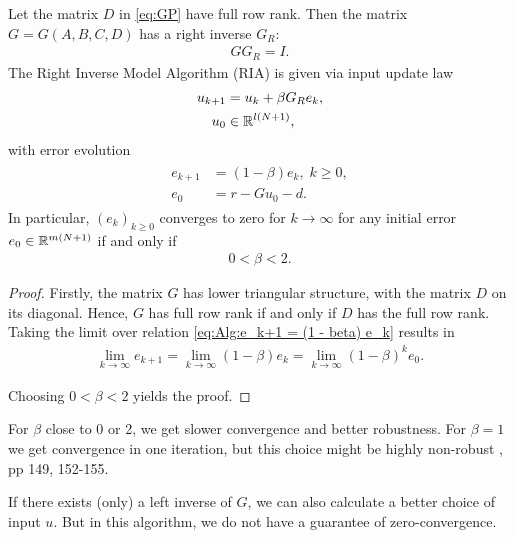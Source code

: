 \begin{alg}
	\label{alg: rightInv}
	Let the matrix $D$ in \eqref{eq:GP} have full row rank. Then the matrix $G = G(A, B, C, D)$ has a right inverse $G_R$: 
	\begin{align*}
	G G_R = I. 
	\end{align*}
	The Right Inverse Model Algorithm (RIA) is given via input update law 
	\begin{align}
	\label{eq:errRightInv}
	\begin{split}
	u_{k+1} &= u_k + \beta G_R e_k, \\
	u_0& \in {\mathbb{R}}^{l (N+1)},
	\end{split}	
	\end{align}
	with error evolution
	\begin{align}
	\label{eq:Alg:e_k+1 = (1 - beta) e_k}
	\begin{split}
	e_{k+1} &= (1- \beta) e_{k}, \; k\geq 0, \\
	e_0 &= r -  Gu_0 -d.
	\end{split}
	\end{align}
	In particular, $(e_k)_{k\geq 0}$ converges to zero for $k \to \infty$ for any initial error $e_0 \in {\mathbb{R}}^{m(N+1)}$ if and only if 
	\begin{align*}
	0 < \beta < 2.
	\end{align*}
\end{alg}
\begin{proof}
	Firstly, the matrix $G$ has lower triangular structure, with the matrix $D$ on its diagonal. Hence, $G$ has full row rank if and only if $D$ has the full row rank.
	Taking the limit over relation \eqref{eq:Alg:e_k+1 = (1 - beta) e_k} results in
	\begin{align}
	\lim_{k \to \infty} e_{k+1} = \lim_{k \to \infty}(1- \beta) e_{k} = \lim_{k \to \infty}(1 - \beta)^k e_0.
	\end{align}
	
	Choosing $0<\beta < 2$ yields the proof. 
\end{proof}

For $\beta$ close to 0 or 2, we get slower convergence and better robustness. For $\beta = 1$ we get convergence in one iteration, but this choice might be highly non-robust \cite{ILC}, pp 149, 152-155.

If there exists (only) a left inverse of $G$, we can also calculate a better choice of input $u$. But in this algorithm, we do not have a guarantee of zero-convergence. 


